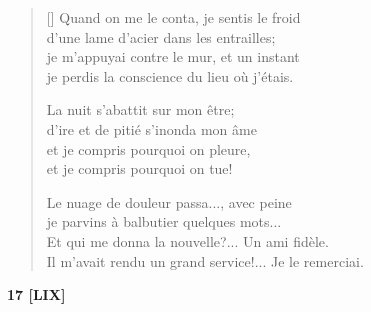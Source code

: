 \documentclass[a4paper,12pt]{book}
\begin{document}
\settowidth{\versewidth}{Il m'avait rendu service!... Je le remerciai.}

\begin{verse}[\versewidth]
  Quand on me le conta, je sentis le froid \\
  d'une lame d'acier dans les entrailles; \\
  je m'appuyai contre le mur, et un instant \\
  je perdis la conscience du lieu où j'étais.

  La nuit s'abattit sur mon être; \\
  d'ire et de pitié s'inonda mon âme \\
  et je compris pourquoi on pleure, \\
  et je compris pourquoi on tue!

  Le nuage de douleur passa..., avec peine \\
  je parvins à balbutier quelques mots... \\
  Et qui me donna la nouvelle?... Un ami fidèle. \\
  Il m'avait rendu un grand service!... Je le remerciai.
\end{verse}

\bigskip

\begin{center}
  \textbf{17 [LIX]}
\end{center}

\settowidth{\versewidth}{pendant que tu éprouves tant et ne sais rien,}
\end{document}

